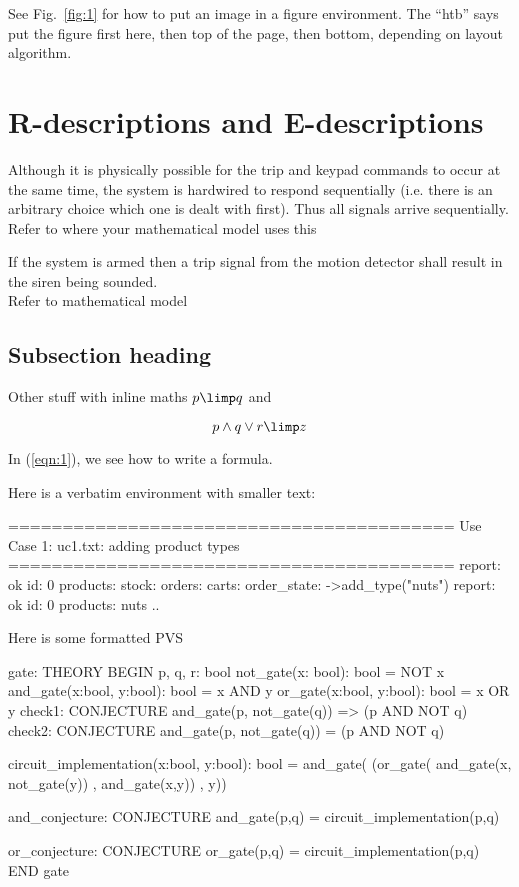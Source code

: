 See Fig.~\ref{fig:1} for how to put an image in a figure environment. The ``htb'' says put the figure first here, then top of the page, then bottom, depending on layout algorithm. 

\section{R-descriptions and E-descriptions}
{Although it is physically possible for the trip and keypad commands to occur at the same time, the system is hardwired to respond sequentially (i.e. there is an arbitrary choice which one is dealt with first). Thus all signals arrive sequentially.}
{Refer to where your mathematical model uses this}
\label{E1}


{If the system is armed then a trip signal from the motion detector shall result in the siren being sounded.\\}
{Refer to mathematical model}
\label{R2}

\subsection{Subsection heading}

Other stuff with inline maths $p \limp q$ and 

\begin{equation}\label{eqn:1}
p \land q \lor r \limp z
\end{equation}

In (\ref{eqn:1}), we see how to write a formula.

Here is a verbatim environment with smaller text:

\begin{code}
=========================================
Use Case 1: uc1.txt: adding product types
=========================================
  report:      ok
  id:          0
  products:   
  stock:       
  orders:      
  carts:       
  order_state: 
->add_type("nuts")
  report:      ok
  id:          0
  products:    nuts
  ..
\end{code}

Here is some formatted PVS
\begin{pvs}
gate: THEORY
BEGIN
  p, q, r: bool
  not_gate(x: bool): bool = NOT x
  and_gate(x:bool, y:bool): bool = x AND y
  or_gate(x:bool, y:bool): bool = x OR y
  check1: CONJECTURE and_gate(p, not_gate(q)) => (p AND NOT q)
  check2: CONJECTURE and_gate(p, not_gate(q)) =  (p AND NOT q)

  circuit_implementation(x:bool, y:bool): bool = 
    and_gate(
              (or_gate(  and_gate(x, not_gate(y))
                       , and_gate(x,y))
             , y))

   and_conjecture: CONJECTURE
     and_gate(p,q) = circuit_implementation(p,q)

   or_conjecture:  CONJECTURE
     or_gate(p,q)  = circuit_implementation(p,q)
END gate
\end{pvs}

